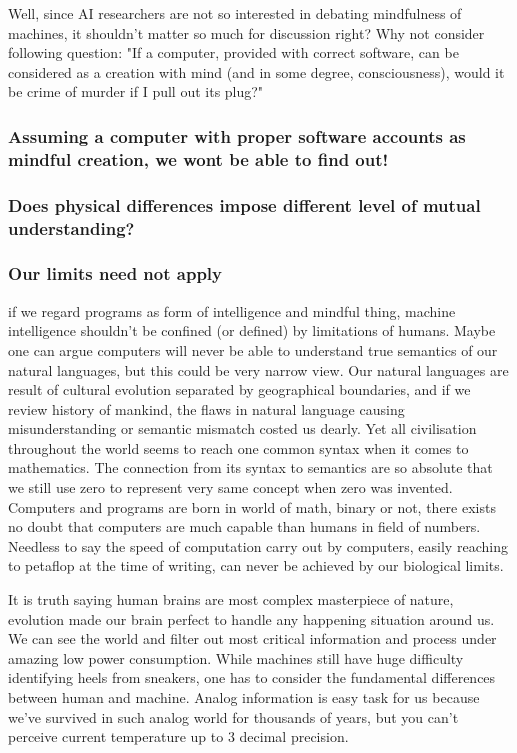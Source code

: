 \documentclass[11pt]{article}
\begin{document}
Well, since AI researchers are not so interested in debating mindfulness of machines, it shouldn't matter so much for discussion right? Why not consider following question: "If a computer, provided with correct software, can be considered as a creation with mind (and in some degree, consciousness), would it be crime of murder if I pull out its plug?"

\subsubsection*{Assuming a computer with proper software accounts as mindful creation, we wont be able to find out!}

\subsubsection*{Does physical differences impose different level of mutual understanding?}

\subsubsection*{Our limits need not apply}

if we regard programs  as form of intelligence and mindful thing, machine intelligence shouldn't be confined (or defined) by limitations of humans. Maybe one can argue computers will never be able to understand true semantics of our natural languages, but this could be very narrow view. Our natural languages are result of cultural evolution separated by geographical boundaries, and if we review history of mankind, the flaws in natural language causing misunderstanding or semantic mismatch costed us dearly. Yet all civilisation throughout the world seems to reach one common syntax when it comes to mathematics. The connection from its syntax to semantics are so absolute that we still use zero to represent very same concept when zero was invented. Computers and programs are born in world of math, binary or not, there exists no doubt that computers are much capable than humans in field of numbers. Needless to say the speed of computation carry out by computers, easily reaching to petaflop at the time of writing, can never be achieved by our biological limits. 

It is truth saying human brains are most complex masterpiece of nature, evolution made our brain perfect to handle any happening situation around us. We can see the world and filter out most critical information and process under amazing low power consumption. While machines still have huge difficulty identifying heels from sneakers, one has to consider the fundamental differences between human and machine. Analog information is easy task for us because we've survived in such analog world for thousands of years, but you can't perceive current temperature up to 3 decimal precision. 
\end{document}
